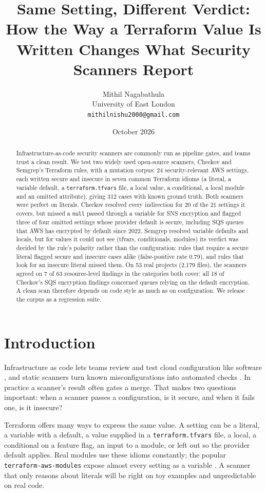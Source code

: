 \documentclass[11pt]{article}
\title{Same Setting, Different Verdict:\\
\large How the Way a Terraform Value Is Written Changes What Security Scanners Report}
\author{Mithil Nagabathula\\University of East London\\\texttt{mithilnishu2000@gmail.com}}
\date{October 2026}
\begin{document}
\maketitle

\begin{abstract}
Infrastructure-as-code security scanners are commonly run as pipeline gates, and teams trust a clean result. We test two widely used
open-source scanners, Checkov and Semgrep's Terraform rules, with a mutation corpus: 24 security-relevant AWS settings, each written
secure and insecure in seven common Terraform idioms (a literal, a variable default, a \texttt{terraform.tfvars} file, a local value,
a conditional, a local module and an omitted attribute), giving 312 cases with known ground truth. Both scanners were perfect on
literals. Checkov resolved every indirection for 20 of the 21 settings it covers, but missed a \texttt{null} passed through a variable
for SNS encryption and flagged three of four omitted settings whose provider default is secure, including SQS queues that AWS has
encrypted by default since 2022. Semgrep resolved variable defaults and locals, but for values it could not see (tfvars, conditionals,
modules) its verdict was decided by the rule's polarity rather than the configuration: rules that require a secure literal flagged
secure and insecure cases alike (false-positive rate 0.79), and rules that look for an insecure literal missed them. On 53 real
projects (2{,}179 files), the scanners agreed on 7 of 63 resource-level findings in the categories both cover; all 18 of Checkov's SQS
encryption findings concerned queues relying on the default encryption. A clean scan therefore depends on code style as much as on
configuration. We release the corpus as a regression suite.
\end{abstract}

\section{Introduction}
Infrastructure as code lets teams review and test cloud configuration like software \cite{rahman2019mapping}, and static scanners turn
known misconfigurations into automated checks \cite{rahman2019seven,saavedra2022glitch}. In practice a scanner's result often gates a
merge. That makes two questions important: when a scanner passes a configuration, is it secure, and when it fails one, is it insecure?

Terraform offers many ways to express the same value. A setting can be a literal, a variable with a default, a value supplied in a
\texttt{terraform.tfvars} file, a local, a conditional on a feature flag, an input to a module, or left out so the provider default
applies. Real modules use these idioms constantly; the popular \texttt{terraform-aws-modules} expose almost every setting as a
variable \cite{tfawsmodules}. A scanner that only reasons about literals will be right on toy examples and unpredictable on real code.
\end{document}
